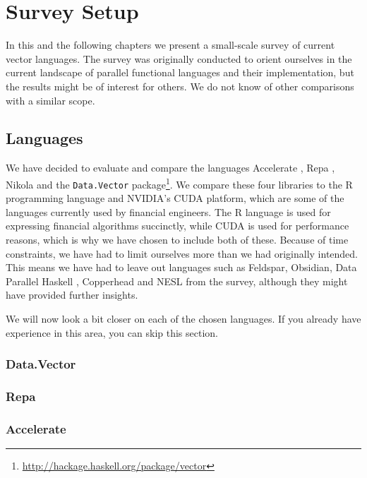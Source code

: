 \chapter{Survey Setup}
In this and the following chapters we present a small-scale survey of
current vector languages. The survey was originally conducted to
orient ourselves in the current landscape of parallel functional
languages and their implementation, but the results might be of
interest for others. We do not know of other comparisons with a
similar scope.

\section{Languages}
We have decided to evaluate and compare the languages Accelerate
\cite{chakravarty2011accelerating}, Repa \cite{keller2010regular},
Nikola \cite{mainland2010nikola} and the \texttt{Data.Vector}
package\footnote{\url{http://hackage.haskell.org/package/vector}}. We
compare these four libraries to the R programming language and NVIDIA's
CUDA platform, which are some of the languages currently used by
financial engineers. The R language is used for expressing financial
algorithms succinctly, while CUDA is used for performance reasons,
which is why we have chosen to include both of these. Because of time
constraints, we have had to limit ourselves more than we had originally
intended. This means we have had to leave out languages such as
Feldspar\cite{axelsson2010feldspar},
Obsidian\cite{svensson2011obsidian}, Data Parallel Haskell \cite{},
Copperhead\cite{Catanzaro2011} and NESL\cite{nesl} from the survey,
although they might have provided further insights.


We will now look a bit closer on each of the chosen languages. If you
already have experience in this area, you can skip this section.

\subsection{Data.Vector}

\subsection{Repa}

\subsection{Accelerate}

